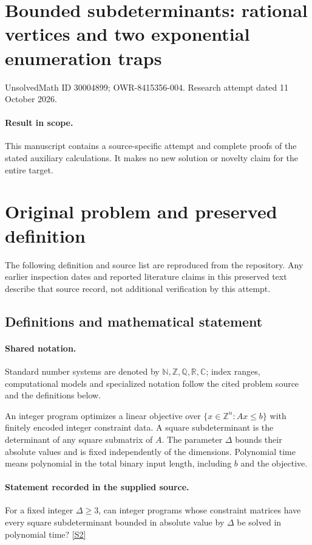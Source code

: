 \documentclass[11pt]{article}
\begin{document}
\section*{Bounded subdeterminants: rational vertices and two exponential enumeration traps}
\noindent UnsolvedMath ID 30004899; OWR-8415356-004. Research attempt dated 11 October 2026.
\paragraph{Result in scope.}This manuscript contains a source-specific attempt and complete proofs of the stated auxiliary calculations. It makes no new solution or novelty claim for the entire target.
\section{Original problem and preserved definition}
The following definition and source list are reproduced from the repository. Any earlier inspection dates and reported literature claims in this preserved text describe that source record, not additional verification by this attempt.
\subsection{Definitions and mathematical statement}

\paragraph{Shared notation.}Standard number systems are denoted by $\mathbb N,\mathbb Z,\mathbb Q,\mathbb R,\mathbb C$; index ranges, computational models and specialized notation follow the cited problem source and the definitions below.


An integer program optimizes a linear objective over $\{x\in\mathbb Z^n:Ax\leq b\}$ with finitely encoded integer constraint data. A square subdeterminant is the determinant of any square submatrix of $A$. The parameter $\Delta$ bounds their absolute values and is fixed independently of the dimensions. Polynomial time means polynomial in the total binary input length, including $b$ and the objective.
\paragraph{Statement recorded in the supplied source.}
For a fixed integer $\Delta\geq3$, can integer programs whose constraint matrices have every square subdeterminant bounded in absolute value by $\Delta$ be solved in polynomial time? \href{https://doi.org/10.4171/owr/2021/53}{[S2]}
\end{document}
